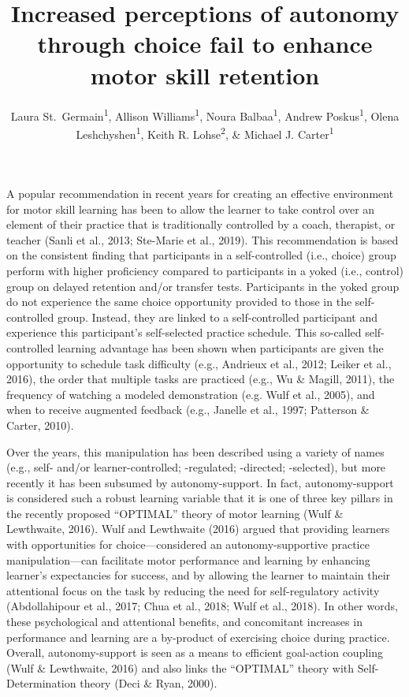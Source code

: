 \documentclass[
  english,
  man,floatsintext]{apa7}
\title{Increased perceptions of autonomy through choice fail to enhance motor skill retention}
\author{Laura St.~Germain\textsuperscript{1}, Allison Williams\textsuperscript{1}, Noura Balbaa\textsuperscript{1}, Andrew Poskus\textsuperscript{1}, Olena Leshchyshen\textsuperscript{1}, Keith R. Lohse\textsuperscript{2}, \& Michael J. Carter\textsuperscript{1}}
\date{}
\affiliation{\vspace{0.5cm}\textsuperscript{1} Department of Kinesiology, McMaster University\\\textsuperscript{2} Program in Physical Therapy, Washington University School of Medicine in Saint Louis}
\begin{document}
\maketitle

A popular recommendation in recent years for creating an effective environment for motor skill learning has been to allow the learner to take control over an element of their practice that is traditionally controlled by a coach, therapist, or teacher (Sanli et al., 2013; Ste-Marie et al., 2019). This recommendation is based on the consistent finding that participants in a self-controlled (i.e., choice) group perform with higher proficiency compared to participants in a yoked (i.e., control) group on delayed retention and/or transfer tests. Participants in the yoked group do not experience the same choice opportunity provided to those in the self-controlled group. Instead, they are linked to a self-controlled participant and experience this participant's self-selected practice schedule. This so-called self-controlled learning advantage has been shown when participants are given the opportunity to schedule task difficulty (e.g., Andrieux et al., 2012; Leiker et al., 2016), the order that multiple tasks are practiced (e.g., Wu \& Magill, 2011), the frequency of watching a modeled demonstration (e.g. Wulf et al., 2005), and when to receive augmented feedback (e.g., Janelle et al., 1997; Patterson \& Carter, 2010).

Over the years, this manipulation has been described using a variety of names (e.g., self- and/or learner-controlled; -regulated; -directed; -selected), but more recently it has been subsumed by autonomy-support. In fact, autonomy-support is considered such a robust learning variable that it is one of three key pillars in the recently proposed ``OPTIMAL'' theory of motor learning (Wulf \& Lewthwaite, 2016). Wulf and Lewthwaite (2016) argued that providing learners with opportunities for choice---considered an autonomy-supportive practice manipulation---can facilitate motor performance and learning by enhancing learner's expectancies for success, and by allowing the learner to maintain their attentional focus on the task by reducing the need for self-regulatory activity (Abdollahipour et al., 2017; Chua et al., 2018; Wulf et al., 2018). In other words, these psychological and attentional benefits, and concomitant increases in performance and learning are a by-product of exercising choice during practice. Overall, autonomy-support is seen as a means to efficient goal-action coupling (Wulf \& Lewthwaite, 2016) and also links the ``OPTIMAL'' theory with Self-Determination theory (Deci \& Ryan, 2000).
\end{document}
